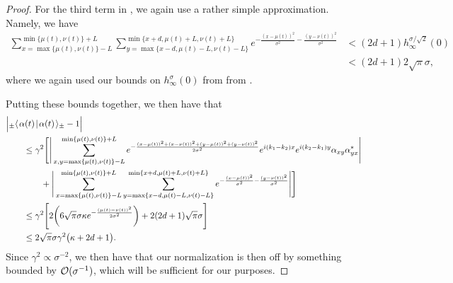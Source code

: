 \documentclass[../thesis-main/thesis-main]{subfiles}
\begin{document}
\begin{proof}
For the third term in , we again use a rather simple approximation.  Namely, we have
\begin{align}
  \sum_{x=\max\{\mu(t),\nu(t)\}-L}^{\min\{\mu(t),\nu(t)\}+L}\sum_{y=\max\{x-d,\mu(t)-L,\nu(t)-L\}}^{\min\{x+d,\mu(t)+L,\nu(t)+L\}} e^{-\frac{(x-\mu(t))^2}{\sigma^2} - \frac{(y-\nu(t))^2}{\sigma^2}} &< (2d+1) h_\infty^{\sigma/\sqrt{2}} (0)\\
  & < (2d+1) 2\sqrt{\pi} \sigma ,
\end{align}
where we again used our bounds on $h_\infty^\sigma(0)$ from  from .

Putting these bounds together, we then have that
\begin{align}
  &\Big|{}_\pm\langle\mspace{2mu} \alpha(t) \mspace{2mu} | \mspace{2mu} \alpha(t)\mspace{2mu} \rangle_{\pm} - 1 \Big| \nonumber\\
  & \qquad\leq \gamma^2 \Bigg[ \Bigg|\sum_{x,y=\max\{\mu(t),\nu(t)\}-L}^{\min\{\mu(t),\nu(t)\}+L} e^{-\frac{(x-\mu(t))^2 + (x-\nu(t))^2 + (y-\mu(t))^2+(y-\nu(t))^2}{2\sigma^2}}e^{i (k_1-k_2) x}e^{i(k_2-k_1)y} \alpha_{xy}\alpha_{yx}^*\Bigg| \nonumber\\
  &\qquad \qquad + \Bigg|\sum_{x=\max\{\mu(t),\nu(t)\}-L}^{\min\{\mu(t),\nu(t)\}+L}\sum_{y=\max\{x-d,\mu(t)-L,\nu(t)-L\}}^{\min\{x+d,\mu(t)+L,\nu(t)+L\}} e^{-\frac{(x-\mu(t))^2}{\sigma^2} - \frac{(y-\nu(t))^2}{\sigma^2}} \Bigg|\Bigg]\\
  &\qquad \leq  \gamma^2 \Bigg[2 \bigg(6 \sqrt{\pi} \sigma \kappa e^{-\frac{(\mu(t)-\nu(t))^2}{2\sigma^2}} \bigg) + 2(2d+1)\sqrt{\pi} \sigma \Bigg]\\
  &\qquad \leq 2\sqrt{\pi} \sigma \gamma^2 \big(\kappa + 2d + 1 \big).
\end{align}
Since $\gamma^2\propto \sigma^{-2}$, we then have that our normalization is then off by something bounded by $\mathcal{O}(\sigma^{-1})$, which will be sufficient for our purposes.



\end{proof}
\end{document}
